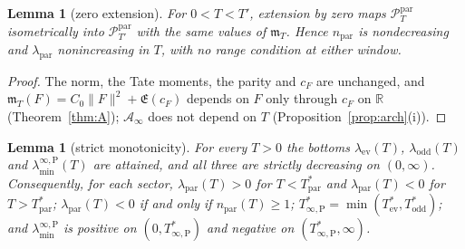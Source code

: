 \documentclass[11pt]{amsart}
\newtheorem{lemma}[theorem]{Lemma}
\theoremstyle{definition}
\theoremstyle{remark}
\newcommand{\R}{\mathbb R}
\newcommand{\PT}{\mathcal P_T}
\newcommand{\cF}{c_F}
\newcommand{\Lev}{\mathfrak E}
\newcommand{\Ainf}{\mathcal A_\infty}
\newcommand{\mT}{\mathfrak m_T}
\newcommand{\laminfP}{\lambda^{\infty,\mathrm P}_{\min}}
\begin{document}
\begin{lemma}[zero extension]\label{lem:zeroext}
For $0<T<T'$, extension by zero maps $\PT^{\mathrm{par}}$ isometrically into
$\mathcal P^{\mathrm{par}}_{T'}$ with the same values of $\mT$. Hence $n_{\mathrm{par}}$ is
nondecreasing and $\lambda_{\mathrm{par}}$ nonincreasing in $T$, with no range condition at either window.
\end{lemma}
\begin{proof}
The norm, the Tate moments, the parity and $\cF$ are unchanged, and $\mT(F)=C_0\|F\|^2+\Lev(\cF)$
depends on $F$ only through $\cF$ on $\R$ (Theorem~\ref{thm:A}); $\Ainf$ does not depend on $T$
(Proposition~\ref{prop:arch}(i)).
\end{proof}

\begin{lemma}[strict monotonicity]\label{lem:strict}
For every $T>0$ the bottoms $\lambda_{\mathrm{ev}}(T)$, $\lambda_{\mathrm{odd}}(T)$ and
$\laminfP(T)$ are attained, and all three are strictly decreasing on $(0,\infty)$. Consequently, for each
sector, $\lambda_{\mathrm{par}}(T)>0$ for $T<T^*_{\mathrm{par}}$ and $\lambda_{\mathrm{par}}(T)<0$ for
$T>T^*_{\mathrm{par}}$; $\lambda_{\mathrm{par}}(T)<0$ if and only if $n_{\mathrm{par}}(T)\ge1$;
$T^*_{\infty,\mathrm P}=\min(T^*_{\mathrm{ev}},T^*_{\mathrm{odd}})$; and $\laminfP$ is positive on
$(0,T^*_{\infty,\mathrm P})$ and negative on $(T^*_{\infty,\mathrm P},\infty)$.
\end{lemma}
\end{document}
